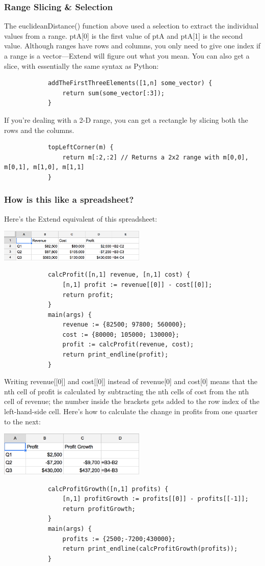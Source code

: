 		\subsubsection{Range Slicing \& Selection}
		The euclideanDistance() function above used a selection to extract the individual values from a range. ptA[0] is the first value of ptA and ptA[1] is the second value. Although ranges have rows and columns, you only need to give one index if a range is a vector---Extend will figure out what you mean. You can also get a slice, with essentially the same syntax as Python:
		\begin{lstlisting}
			addTheFirstThreeElements([1,n] some_vector) {
				return sum(some_vector[:3]);
			}
		\end{lstlisting}
		\medskip \noindent
		If you're dealing with a 2-D range, you can get a rectangle by slicing both the rows and the columns.
		\begin{lstlisting}
			topLeftCorner(m) {
				return m[:2,:2] // Returns a 2x2 range with m[0,0], m[0,1], m[1,0], m[1,1]
			}
		\end{lstlisting}
		\medskip \noindent
		\subsubsection{How is this like a spreadsheet?}
		Here's the Extend equivalent of this spreadsheet:
		\begin{center}
		\includegraphics[width=7cm]{img/tutRCP.png}
		\end{center}
		\begin{lstlisting}
			calcProfit([n,1] revenue, [n,1] cost) {
				[n,1] profit := revenue[[0]] - cost[[0]];
				return profit;
			}
			main(args) {
				revenue := {82500; 97800; 560000};
				cost := {80000; 105000; 130000};
				profit := calcProfit(revenue, cost);
				return print_endline(profit);
			}
		\end{lstlisting}
		Writing revenue[[0]] and cost[[0]] instead of revenue[0] and cost[0] means that the nth cell of profit is calculated by subtracting the nth cells of cost from the nth cell of revenue; the number inside the brackets gets added to the row index of the left-hand-side cell. Here's how to calculate the change in profits from one quarter to the next:
		\begin{center}
		\includegraphics[width=7cm]{img/tutPG.png}
		\end{center}
		\begin{lstlisting}
			calcProfitGrowth([n,1] profits) {
				[n,1] profitGrowth := profits[[0]] - profits[[-1]];
				return profitGrowth;
			}
			main(args) {
				profits := {2500;-7200;430000};
				return print_endline(calcProfitGrowth(profits));
			}
		\end{lstlisting}

